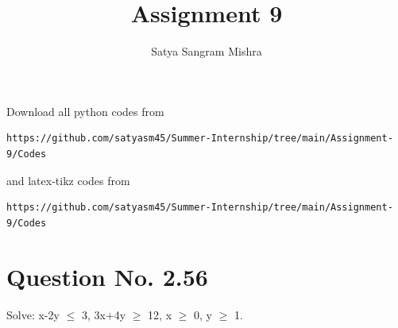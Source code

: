 \documentclass[journal,12pt,twocolumn]{IEEEtran}
\begin{document}
     \def\centbox#1{\makebox[0in]{#1}}
     \def\topbox#1{\raisebox{-\baselineskip}[0in][0in]{#1}}
     \def\midbox#1{\raisebox{-0.5\baselineskip}[0in][0in]{#1}}
\vspace{3cm}
\title{Assignment 9}
\author{Satya Sangram Mishra}
\maketitle
\newpage
\bigskip
\renewcommand{\thefigure}{\theenumi}
\renewcommand{\thetable}{\theenumi}
Download all python codes from 
\begin{lstlisting}
https://github.com/satyasm45/Summer-Internship/tree/main/Assignment-9/Codes
\end{lstlisting}
%
and latex-tikz codes from 
%
\begin{lstlisting}
https://github.com/satyasm45/Summer-Internship/tree/main/Assignment-9/Codes
\end{lstlisting}
%
\section{Question No. 2.56}
Solve:  x-2y $\leq$ 3, 3x+4y $\geq$ 12, x $\geq$ 0, y $\geq$ 1.
\end{document}

